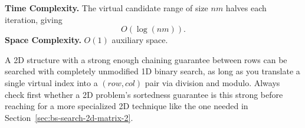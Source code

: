 \begin{complexitybox}
\textbf{Time Complexity.} The virtual candidate range of size $nm$ halves
each iteration, giving
\[
  O(\log(nm)).
\]
\textbf{Space Complexity.} $O(1)$ auxiliary space.
\end{complexitybox}

\begin{takeawaybox}
A 2D structure with a strong enough chaining guarantee between rows can be
searched with completely unmodified 1D binary search, as long as you
translate a single virtual index into a $(\textit{row}, \textit{col})$
pair via division and modulo. Always check first whether a 2D problem's
sortedness guarantee is this strong before reaching for a more specialized
2D technique like the one needed in
Section~\ref{sec:bs-search-2d-matrix-2}.
\end{takeawaybox}
